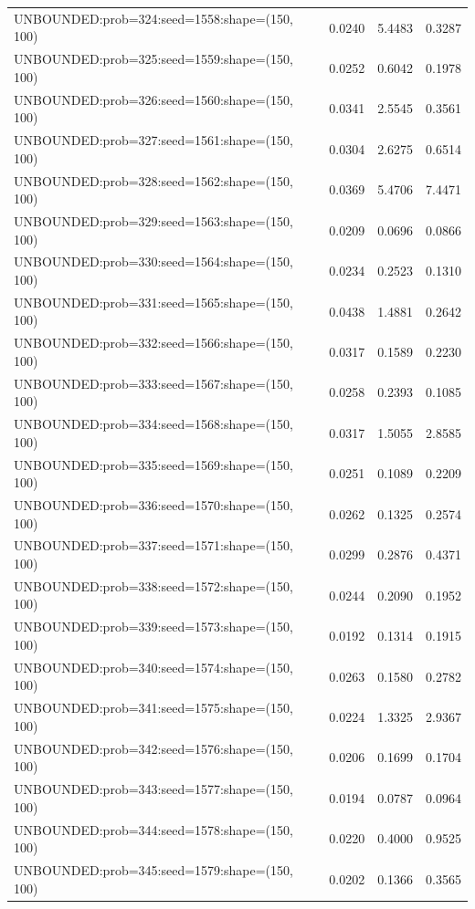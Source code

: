 \begin{longtable}{lccc}
UNBOUNDED:prob=324:seed=1558:shape=(150, 100) &   0.0240 &  5.4483 &  0.3287 \\
UNBOUNDED:prob=325:seed=1559:shape=(150, 100) &   0.0252 &  0.6042 &  0.1978 \\
UNBOUNDED:prob=326:seed=1560:shape=(150, 100) &   0.0341 &  2.5545 &  0.3561 \\
UNBOUNDED:prob=327:seed=1561:shape=(150, 100) &   0.0304 &  2.6275 &  0.6514 \\
UNBOUNDED:prob=328:seed=1562:shape=(150, 100) &   0.0369 &  5.4706 &  7.4471 \\
UNBOUNDED:prob=329:seed=1563:shape=(150, 100) &   0.0209 &  0.0696 &  0.0866 \\
UNBOUNDED:prob=330:seed=1564:shape=(150, 100) &   0.0234 &  0.2523 &  0.1310 \\
UNBOUNDED:prob=331:seed=1565:shape=(150, 100) &   0.0438 &  1.4881 &  0.2642 \\
UNBOUNDED:prob=332:seed=1566:shape=(150, 100) &   0.0317 &  0.1589 &  0.2230 \\
UNBOUNDED:prob=333:seed=1567:shape=(150, 100) &   0.0258 &  0.2393 &  0.1085 \\
UNBOUNDED:prob=334:seed=1568:shape=(150, 100) &   0.0317 &  1.5055 &  2.8585 \\
UNBOUNDED:prob=335:seed=1569:shape=(150, 100) &   0.0251 &  0.1089 &  0.2209 \\
UNBOUNDED:prob=336:seed=1570:shape=(150, 100) &   0.0262 &  0.1325 &  0.2574 \\
UNBOUNDED:prob=337:seed=1571:shape=(150, 100) &   0.0299 &  0.2876 &  0.4371 \\
UNBOUNDED:prob=338:seed=1572:shape=(150, 100) &   0.0244 &  0.2090 &  0.1952 \\
UNBOUNDED:prob=339:seed=1573:shape=(150, 100) &   0.0192 &  0.1314 &  0.1915 \\
UNBOUNDED:prob=340:seed=1574:shape=(150, 100) &   0.0263 &  0.1580 &  0.2782 \\
UNBOUNDED:prob=341:seed=1575:shape=(150, 100) &   0.0224 &  1.3325 &  2.9367 \\
UNBOUNDED:prob=342:seed=1576:shape=(150, 100) &   0.0206 &  0.1699 &  0.1704 \\
UNBOUNDED:prob=343:seed=1577:shape=(150, 100) &   0.0194 &  0.0787 &  0.0964 \\
UNBOUNDED:prob=344:seed=1578:shape=(150, 100) &   0.0220 &  0.4000 &  0.9525 \\
UNBOUNDED:prob=345:seed=1579:shape=(150, 100) &   0.0202 &  0.1366 &  0.3565 \\

\end{longtable}
